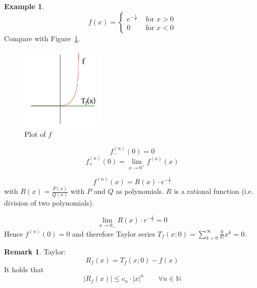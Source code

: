 \documentclass[a4paper,landscape,twocolumn]{article}
\theoremstyle{definition}
\newtheorem{rem}{Remark}
\newtheorem{ex}{Example}
\newcommand\abs[1]{\left|#1\right|}
\begin{document}
\begin{ex}
  \[
    f(x) = \begin{cases}
      e^{-\frac1x} & \text{ for } x > 0 \\
      0 & \text{ for } x < 0
    \end{cases}
  \]
  Compare with Figure~\ref{img:e1x}.
  \begin{figure}[!h]
    \begin{center}
      \includegraphics[width=150px]{img/e1x.pdf}
      \caption{Plot of $f$}
      \label{img:e1x}
    \end{center}
  \end{figure}
  \[ f_-^{(n)}(0) = 0 \]
  \[ f_+^{(n)}(0) = \lim_{x\to0^+} f^{(n)}(x) \]

  \[ f^{(n)}(x) = R(x) \cdot e^{-\frac1x} \]
  with $R(x) = \frac{P(x)}{Q(x)}$ with $P$ and $Q$ as polynomials.
  $R$ is a rational function (i.e. division of two polynomials).

  \[ \lim_{x\to0_+} R(x) \cdot e^{-\frac1x} = 0 \]
  Hence $f^{(n)}(0) = 0$ and therefore Taylor series
  $T_f(x; 0) = \sum_{k=0}^\infty \frac{0}{k!} x^k = 0$.
\end{ex}

\begin{rem}
  Taylor:
  \[ R_f(x) = T_f(x; 0) - f(x) \]
  It holds that
  \[ \abs{R_f(x)} \leq c_n \cdot \abs{x}^n \qquad \forall n \in \mathbb N \]
\end{rem}
\end{document}
